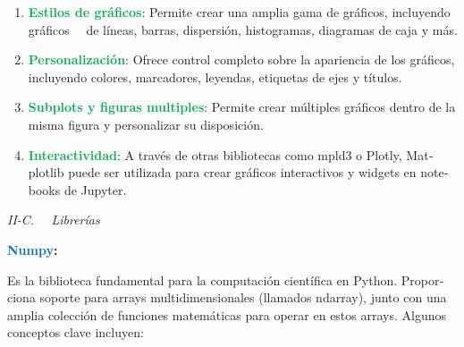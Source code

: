 \documentclass[letterpaper]{article}
\newcommand\textstyleStrong[1]{\textbf{#1}}
\newcommand\textstyleHTMLCode[1]{\textrm{#1}}
\begin{document}
\begin{multicols}{2}
\begin{enumerate}[series=listWWNumv,label=\Roman*.,ref=\Roman*]
\item {
\textstyleStrong{\foreignlanguage{spanish}{\textcolor[HTML]{00B050}{Estilos de gráficos}}}\foreignlanguage{spanish}{:
Permite crear una amplia gama de gráficos, incluyendo gráficos \ \ de líneas, barras, dispersión, histogramas,
diagramas de caja y más.}}
\item {
\textstyleStrong{\foreignlanguage{spanish}{\textcolor[HTML]{00B050}{Personalización}}}\foreignlanguage{spanish}{: Ofrece
control completo sobre la apariencia de los gráficos, incluyendo colores, marcadores, leyendas, etiquetas de ejes y
títulos.}}
\item {
\textstyleStrong{\foreignlanguage{spanish}{\textcolor[HTML]{00B050}{Subplots y figuras
multiples}}}\foreignlanguage{spanish}{: Permite crear múltiples gráficos dentro de la misma figura y personalizar su
disposición.}}
\item {
\textstyleStrong{\foreignlanguage{spanish}{\textcolor[HTML]{00B050}{Interactividad}}}\foreignlanguage{spanish}{: A
través de otras bibliotecas como }\textstyleHTMLCode{\foreignlanguage{spanish}{mpld3}}\foreignlanguage{spanish}{ o
}\textstyleHTMLCode{\foreignlanguage{spanish}{Plotly}}\foreignlanguage{spanish}{, Matplotlib puede ser utilizada para
crear gráficos interactivos y widgets en notebooks de Jupyter.}}
\end{enumerate}

\bigskip

{
\textit{II-C. \ \ Librerías}}

{
\foreignlanguage{spanish}{\textbf{\textcolor[HTML]{0070C0}{Numpy}}}\foreignlanguage{spanish}{\textbf{:}}}

{
\foreignlanguage{spanish}{Es la biblioteca fundamental para la computación científica en Python. Proporciona soporte
para arrays multidimensionales (llamados
}\textstyleHTMLCode{\foreignlanguage{spanish}{ndarray}}\foreignlanguage{spanish}{), junto con una amplia colección de
funciones matemáticas para operar en estos arrays. }Algunos conceptos clave incluyen:}


\bigskip


\end{multicols}
\end{document}
